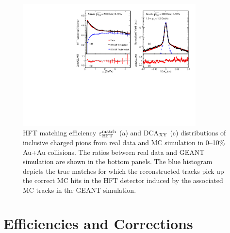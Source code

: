 \documentclass[%
 reprint,	
showpacs,
 amsmath,amssymb,
 aps,
 prc,
]{revtex4-1}
\begin{document}
\begin{figure}
\centering
\includegraphics[width=0.84\textwidth]{fig/HijingRatioDca.pdf}
\caption{HFT matching efficiency $\varepsilon_{\rm HFT}^{\rm match}$ (a) and DCA$_{\rm XY}$ (c) distributions of inclusive charged pions from real data and MC simulation in 0--10\% Au+Au collisions. The ratios between real data and GEANT simulation are shown in the bottom panels. The blue histogram depicts the true matches for which the reconstructed tracks pick up the correct MC hits in the HFT detector induced by the associated MC tracks in the GEANT simulation.}
\label{fig:HijingRatioDca} 
\end{figure}


\section{Efficiencies and Corrections}
\label{correction}
\end{document}
